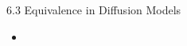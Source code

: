 \begin{frame}{6.3 Equivalence in Diffusion Models}
    \begin{itemize}
        \item
    \end{itemize}
\end{frame}
